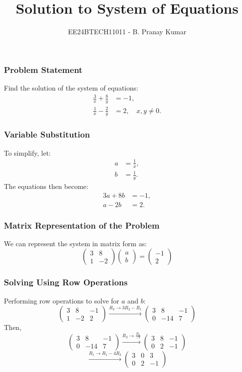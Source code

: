 \documentclass{beamer}
\title{Solution to System of Equations}
\author{EE24BTECH11011 - B. Pranay Kumar}
\date{}
\begin{document}
\frame{\titlepage}

\begin{frame}
    \frametitle{Problem Statement}
    Find the solution of the system of equations:
    \begin{align}
        \frac{3}{x} + \frac{8}{y} &= -1, \\
        \frac{1}{x} - \frac{2}{y} &= 2, \quad x, y \neq 0.
    \end{align}
\end{frame}

\begin{frame}
    \frametitle{Variable Substitution}
    To simplify, let:
    \begin{align*}
        a &= \frac{1}{x}, \\
        b &= \frac{1}{y}.
    \end{align*}
    The equations then become:
    \begin{align}
        3a + 8b &= -1, \\
        a - 2b &= 2.
    \end{align}
\end{frame}

\begin{frame}
    \frametitle{Matrix Representation of the Problem}
    We can represent the system in matrix form as:
    \[
    \begin{pmatrix} 3 & 8 \\ 1 & -2 \end{pmatrix} \begin{pmatrix} a \\ b \end{pmatrix} = \begin{pmatrix} -1 \\ 2 \end{pmatrix}
    \]
\end{frame}

\begin{frame}
    \frametitle{Solving Using Row Operations}
    Performing row operations to solve for \(a\) and \(b\):
    \[
    \begin{pmatrix} 3 & 8 & -1 \\ 1 & -2 & 2 \end{pmatrix}
    \xrightarrow{R_2 \rightarrow 3R_2 - R_1}
    \begin{pmatrix} 3 & 8 & -1 \\ 0 & -14 & 7 \end{pmatrix}
    \]
    Then,
    \[
    \begin{pmatrix} 3 & 8 & -1 \\ 0 & -14 & 7 \end{pmatrix}
    \xrightarrow{R_2 \rightarrow \frac{R_2}{-7}}
    \begin{pmatrix} 3 & 8 & -1 \\ 0 & 2 & -1 \end{pmatrix}
    \]
    \[
    \xrightarrow{R_1 \rightarrow R_1 - 4R_2}
    \begin{pmatrix} 3 & 0 & 3 \\ 0 & 2 & -1 \end{pmatrix}
    \]
\end{frame}
\end{document}

